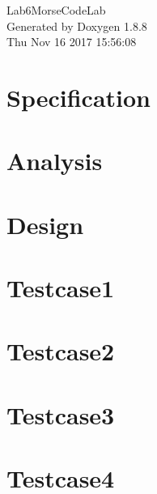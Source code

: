 \documentclass[twoside]{article}
\newcommand{\+}{\discretionary{\mbox{\scriptsize$\hookleftarrow$}}{}{}}
\begin{document}
\hypersetup{pageanchor=false,
             bookmarks=true,
             bookmarksnumbered=true,
             pdfencoding=unicode
            }
\begin{titlepage}
\vspace*{7cm}
\begin{center}%
{\Large Lab6\+Morse\+Code\+Lab }\\
\vspace*{1cm}
{\large Generated by Doxygen 1.8.8}\\
\vspace*{0.5cm}
{\small Thu Nov 16 2017 15:56:08}\\
\end{center}
\end{titlepage}
\tableofcontents
{}
\hypersetup{pageanchor=true}

\section{Specification}
\label{Specification}
\hypertarget{Specification}{}

\section{Analysis}
\label{Analysis}
\hypertarget{Analysis}{}

\section{Design}
\label{Design}
\hypertarget{Design}{}

\section{Testcase1}
\label{Testcase1}
\hypertarget{Testcase1}{}

\section{Testcase2}
\label{Testcase2}
\hypertarget{Testcase2}{}

\section{Testcase3}
\label{Testcase3}
\hypertarget{Testcase3}{}

\section{Testcase4}
\label{Testcase4}
\hypertarget{Testcase4}{}

\end{document}
